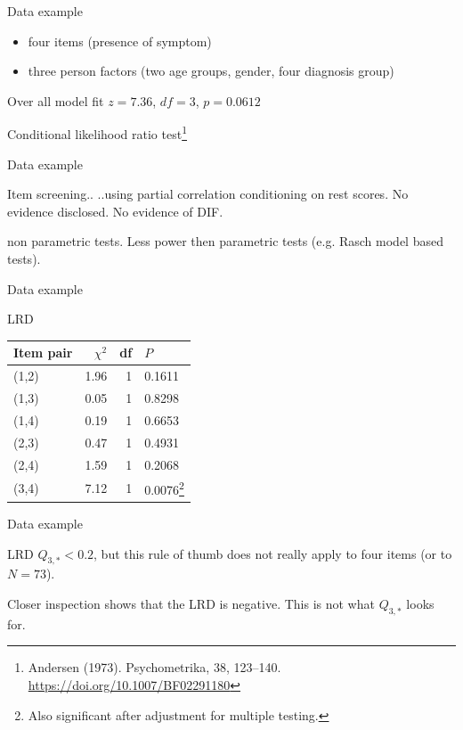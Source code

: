\documentclass[xcolor=table]{beamer}
\begin{document}
\begin{frame}{Data example}
\begin{itemize}
\item four items (presence of symptom)
\item three person factors (two age groups, gender, four diagnosis group)
\end{itemize}
\begin{block}{Over all model fit}
$z=7.36$, $df=3$, $p=0.0612$    
\end{block}
Conditional likelihood ratio test\footnote{Andersen (1973). Psychometrika, 38, 123–140. \url{https://doi.org/10.1007/BF02291180}}
\end{frame}

\begin{frame}{Data example}
\begin{block}{Item screening..}
..using partial correlation conditioning on rest scores.
\pause
No evidence disclosed.
\pause
No evidence of DIF.
\end{block}
\pause
non parametric tests. Less power then parametric tests (e.g. Rasch model based tests).
\end{frame}

\begin{frame}{Data example}
\begin{block}{LRD}
\begin{tabular}{lrrl}
\hline
Item pair & $\chi^2$ & df & $P$  \\
\hline     
(1,2) & 1.96 & 1 & 0.1611 \\
(1,3) & 0.05 & 1 & 0.8298 \\
(1,4) & 0.19 & 1 & 0.6653 \\
(2,3) & 0.47 & 1 & 0.4931 \\
(2,4) & 1.59 & 1 & 0.2068 \\
(3,4) & 7.12 & 1 & 0.0076\footnote{Also significant after adjustment for multiple testing.} \\
\hline
\end{tabular}
\end{block}
\end{frame}

\begin{frame}{Data example}
\begin{block}{LRD}
$Q_{3,\ast} < 0.2$, but this rule of thumb does not really apply to four items (or to $N=73$).
\end{block}
\pause
Closer inspection shows that the LRD is negative. This is not what $Q_{3,\ast}$ looks for.
\end{frame}
\end{document}
